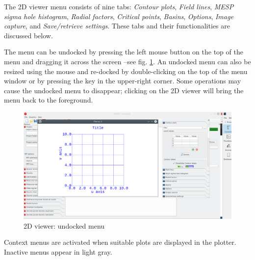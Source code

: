 \documentclass[10pt]{article}
\begin{document}
The 2D viewer menu consists of nine tabs:  
{\it Contour plots}, {\it Field lines}, {\it MESP sigma hole histogram}, {\it Radial factors},  
{\it Critical points}, {\it Basins}, {\it Options}, {\it Image capture}, and {\it Save/retrieve settings}.  
These tabs and their functionalities are discussed below.  

The menu can be undocked by pressing the left mouse button on the top of the menu  
and dragging it across the screen --see fig. \ref{fig:3_2}.  
An undocked menu can also be resized using the mouse and re-docked  
by double-clicking on the top of the menu window or by pressing the \undock key in the upper-right corner.  
Some operations may cause the undocked menu to disappear;  
clicking on the 2D viewer will bring the menu back to the foreground.


\begin{figure}[H]
    \begin{center}
        \includegraphics[width=.5\linewidth]{damqt320_2D_viewer_undock.png}
    \end{center}
    \caption{2D viewer: undocked menu \label{fig:3_2}}
\end{figure}

\vspace*{5mm}

Context menus are activated when suitable plots are displayed in the plotter. Inactive menus appear in light gray.   
\end{document}
